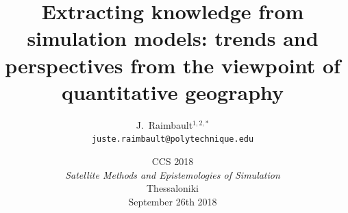 \documentclass[english,11pt]{beamer}
\begin{document}
\title{Extracting knowledge from simulation models: trends and perspectives from the viewpoint of quantitative geography}

\author{J.~Raimbault$^{1,2,\ast}$\\
\texttt{juste.raimbault@polytechnique.edu}
}




\date{CCS 2018\\\smallskip
\textit{Satellite Methods and Epistemologies of Simulation}\\\smallskip
Thessaloniki\\\smallskip
September 26th 2018
}

\frame{\maketitle}



%

\end{document}
